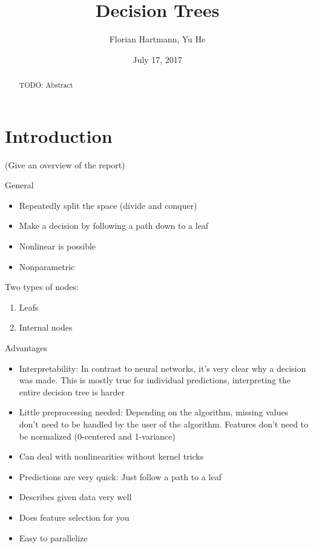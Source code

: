 \documentclass[a4paper]{article}
\title{Decision Trees}
\author{Florian Hartmann, Yu He}
\date{July 17, 2017}
\begin{document}
\maketitle

\begin{abstract}
TODO: Abstract
\end{abstract}

\section{Introduction}

(Give an overview of the report)

General

\begin{itemize}
	\item Repeatedly split the space (divide and conquer)
    \item Make a decision by following a path down to a leaf
    \item Nonlinear is possible
    \item Nonparametric
\end{itemize}

Two types of nodes:
\begin{enumerate}
	\item Leafs
    \item Internal nodes
\end{enumerate}

Advantages

\begin{itemize}
	\item Interpretability: In contrast to neural networks, it's very clear why a decision was made. This is mostly true for individual predictions, interpreting the entire decision tree is harder
    \item Little preprocessing needed: Depending on the algorithm, missing values don't need to be handled by the user of the algorithm. Features don't need to be normalized (0-centered and 1-variance)
    \item Can deal with nonlinearities without kernel tricks
    \item Predictions are very quick: Just follow a path to a leaf
    \item Describes given data very well
    \item Does feature selection for you
    \item Easy to parallelize
\end{itemize}
\end{document}
